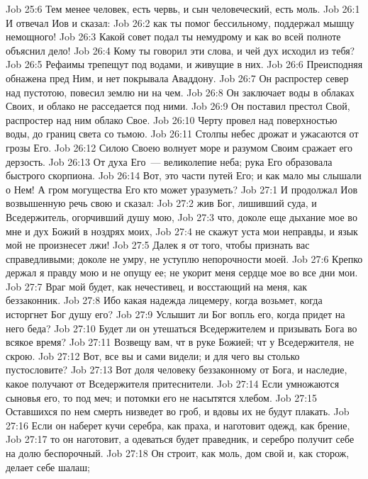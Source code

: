 \vs Job 25:6 Тем менее человек,  есть червь, и сын человеческий,  есть моль.
\vs Job 26:1 И отвечал Иов и сказал:
\vs Job 26:2 как ты помог бессильному, поддержал мышцу немощного!
\vs Job 26:3 Какой совет подал ты немудрому и как во всей полноте объяснил дело!
\vs Job 26:4 Кому ты говорил эти слова, и чей дух исходил из тебя?
\vs Job 26:5 Рефаимы трепещут под водами, и живущие в них.
\vs Job 26:6 Преисподняя обнажена пред Ним, и нет покрывала Аваддону.
\vs Job 26:7 Он распростер север над пустотою, повесил землю ни на чем.
\vs Job 26:8 Он заключает воды в облаках Своих, и облако не расседается под ними.
\vs Job 26:9 Он поставил престол Свой, распростер над ним облако Свое.
\vs Job 26:10 Черту провел над поверхностью воды, до границ света со тьмою.
\vs Job 26:11 Столпы небес дрожат и ужасаются от грозы Его.
\vs Job 26:12 Силою Своею волнует море и разумом Своим сражает его дерзость.
\vs Job 26:13 От духа Его~--- великолепие неба; рука Его образовала быстрого скорпиона.
\vs Job 26:14 Вот, это части путей Его; и как мало мы слышали о Нем! А гром могущества Его кто может уразуметь?
\vs Job 27:1 И продолжал Иов возвышенную речь свою и сказал:
\vs Job 27:2 жив Бог, лишивший  суда, и Вседержитель, огорчивший душу мою,
\vs Job 27:3 что, доколе еще дыхание мое во мне и дух Божий в ноздрях моих,
\vs Job 27:4 не скажут уста мои неправды, и язык мой не произнесет лжи!
\vs Job 27:5 Далек я от того, чтобы признать вас справедливыми; доколе не умру, не уступлю непорочности моей.
\vs Job 27:6 Крепко держал я правду мою и не опущу ее; не укорит меня сердце мое во все дни мои.
\vs Job 27:7 Враг мой будет, как нечестивец, и восстающий на меня, как беззаконник.
\vs Job 27:8 Ибо какая надежда лицемеру, когда возьмет, когда исторгнет Бог душу его?
\vs Job 27:9 Услышит ли Бог вопль его, когда придет на него беда?
\vs Job 27:10 Будет ли он утешаться Вседержителем и призывать Бога во всякое время?
\vs Job 27:11 Возвещу вам, чт в руке Божией; чт у Вседержителя, не скрою.
\vs Job 27:12 Вот, все вы и сами видели; и для чего вы столько пустословите?
\vs Job 27:13 Вот доля человеку беззаконному от Бога, и наследие, какое получают от Вседержителя притеснители.
\vs Job 27:14 Если умножаются сыновья его, то под меч; и потомки его не насытятся хлебом.
\vs Job 27:15 Оставшихся по нем смерть низведет во гроб, и вдовы их не будут плакать.
\vs Job 27:16 Если он наберет кучи серебра, как праха, и наготовит одежд, как брение,
\vs Job 27:17 то он наготовит, а одеваться будет праведник, и серебро получит себе на долю беспорочный.
\vs Job 27:18 Он строит, как моль, дом свой и, как сторож, делает себе шалаш;
